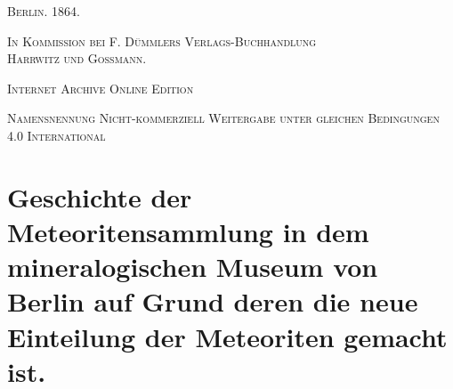 \documentclass[a4paper, 11pt, oneside]{article}
\begin{document}
\begin{titlepage}
	\vspace{1\baselineskip}

	{\small\scshape Berlin. 1864.}
	
	{\small\scshape{In Kommission bei F. Dümmlers Verlags-Buchhandlung\\Harrwitz und Gossmann.}}
	
	\vspace{0.5\baselineskip} %

    \scshape Internet Archive Online Edition  %
	
	{\scshape\small Namensnennung Nicht-kommerziell Weitergabe unter gleichen Bedingungen 4.0 International} %
\end{titlepage}
\setlength{\parskip}{1mm plus1mm minus1mm}
\clearpage
\tableofcontents
\clearpage
\section*{Geschichte der Meteoritensammlung in dem mineralogischen Museum von Berlin auf Grund deren die neue Einteilung der Meteoriten gemacht ist.}
\end{document}
